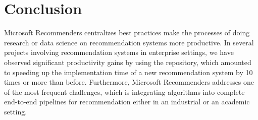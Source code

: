 \section{Conclusion}

Microsoft Recommenders centralizes best practices make the processes of 
doing research or data science on recommendation systems more productive.
In several projects involving recommendation systems in enterprise settings, we have observed significant productivity gains by using the repository,
which amounted to speeding up the implementation time of a new recommendation 
system by 10 times or more than before.
Furthermore, Microsoft Recommenders addresses one of the most frequent challenges, which is integrating
algorithms into complete end-to-end pipelines for recommendation either in an industrial or 
an academic setting.